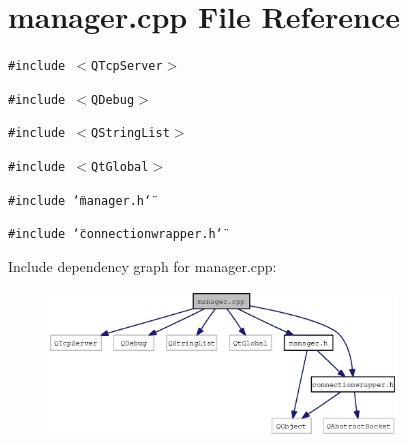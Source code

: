 \section{manager.cpp File Reference}
\label{manager_8cpp}
{\tt \#include $<$QTcpServer$>$}\par
{\tt \#include $<$QDebug$>$}\par
{\tt \#include $<$QStringList$>$}\par
{\tt \#include $<$QtGlobal$>$}\par
{\tt \#include \char`\"{}manager.h\char`\"{}}\par
{\tt \#include \char`\"{}connectionwrapper.h\char`\"{}}\par


Include dependency graph for manager.cpp:\nopagebreak
\begin{figure}[H]
\begin{center}
\leavevmode
\includegraphics[width=262pt]{manager_8cpp__incl}
\end{center}
\end{figure}
